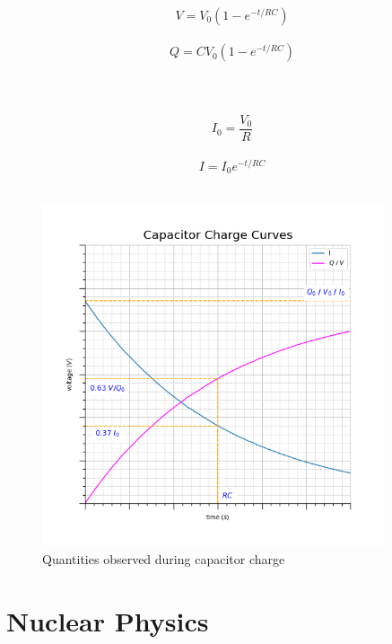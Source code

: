 \documentclass[12pt]{article}
\begin{document}
\begin{figure}[H]
\centering
\begin{minipage}{0.8\textwidth}
\begin{tcolorbox}[
sharp corners=all,
colback=white,
colframe=lightgray,
size=tight,
boxrule=0.2mm,
left=10mm, right=10mm,
]
\begin{multicols}{2}
\noindent
\\
\[V = V_0 \left ( 1 - e^{-t/RC} \right )\]
\\
\[Q = CV_0 \left ( 1 - e^{-t/RC} \right )\]
\\
\columnbreak
\\
\\
\[I_0 = \dfrac{V_0}{R}\]
\\
\[I = I_0 e^{-t/RC}\]
\\
\end{multicols}
\end{tcolorbox}
\end{minipage}
\end{figure}

\begin{figure}[H]
\centering
\includegraphics[width=0.9\textwidth,keepaspectratio]{./images/capacitor_exp_charge.png}
\caption{Quantities observed during capacitor charge}
\end{figure}

\section{Nuclear Physics}
\label{sec:org843603d}
\end{document}
